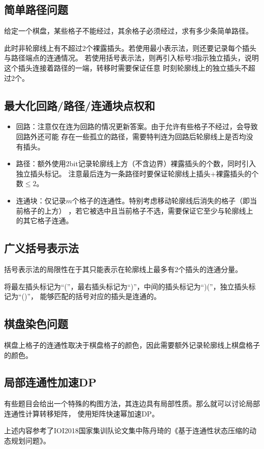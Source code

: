 \subsection{简单路径问题}
给定一个棋盘，某些格子不能经过，其余格子必须经过，求有多少条简单路径。

此时非轮廓线上有不超过2个裸露插头。若使用最小表示法，则还要记录每个插头与路径端点的连通情况。
若使用括号表示法，则再引入标号3指示独立插头，说明这个插头连接着路径的一端，转移时需要保证任意
时刻轮廓线上的独立插头不超过2个。
\subsection{最大化回路/路径/连通块点权和}
\begin{itemize}
    \item 回路：注意仅在连为回路的情况更新答案。由于允许有些格子不经过，会导致回路外还可能
    存在一些孤立的路径，需要特判连为回路后轮廓线上是否均没有插头。
    \item 路径：额外使用2bit记录轮廓线上方（不含边界）裸露插头的个数，同时引入独立插头标记。
    注意最后连为一条路径时要保证轮廓线上插头+裸露插头的个数$\leq 2$。
    \item 连通块：仅记录$m$个格子的连通性。特别考虑移动轮廓线后消失的格子（即当前格子的上方）
    ，若它被选中且当前格子不选，需要保证它至少与轮廓线上的其它格子连通。
\end{itemize}
\subsection{广义括号表示法}
括号表示法的局限性在于其只能表示在轮廓线上最多有2个插头的连通分量。

将最左插头标记为``(''，最右插头标记为``)''，中间的插头标记为``)(''，独立插头标记为``()''，
能够匹配的括号对应的插头是连通的。
\subsection{棋盘染色问题}
棋盘上格子的连通性取决于棋盘格子的颜色，因此需要额外记录轮廓线上棋盘格子的颜色。
\subsection{局部连通性加速DP}
有些题目会给出一个特殊的构图方法，其连边具有局部性质。那么就可以讨论局部连通性计算转移矩阵，
使用矩阵快速幂加速DP。

上述内容参考了IOI2018国家集训队论文集中陈丹琦的《基于连通性状态压缩的动态规划问题》。
